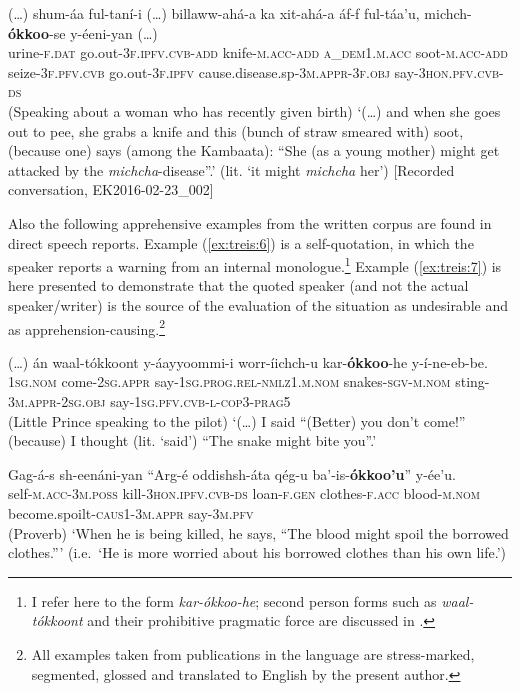 \documentclass[output=paper,colorlinks,citecolor=brown,]{langscibook}
\begin{document}
\ea\label{ex:treis:5}
\gll \textnormal{(\ldots)} 	shum-áa 		ful-taní-i \textnormal{(\ldots)}  billaww-ahá-a 		ka 					xit-ahá-a 			áf-f ful-táa'u, 			michch-\textbf{ókkoo}-se 						y-éeni-yan \textnormal{(\ldots)}\\
{} urine-\textsc{f.dat} go.out-\textsc{3f.ipfv.cvb-add} {} knife-\textsc{m.acc-add} \textsc{a\_dem1.m.acc}	soot-\textsc{m.acc-add}	seize-\textsc{3f.pfv.cvb} go.out-\textsc{3f.ipfv} cause.disease.sp-\textsc{3m.appr-3f.obj} say-\textsc{3hon.pfv.cvb-ds} \\
\glt (Speaking about a woman who has recently given birth) `(\ldots) and when she goes out to pee, she grabs a knife and this (bunch of straw smeared with) soot, (because one) says (among the Kambaata): ``She (as a young mother) might get attacked by the \textit{michcha}-disease''.'  (lit. `it might \textit{michcha} her') [Recorded conversation, EK2016-02-23\_002]
\z

Also the following apprehensive examples from the written corpus are found in direct speech reports. Example (\ref{ex:treis:6}) is a self-quotation, in which the speaker reports a warning from an internal monologue.\footnote{I refer here to the form \textit{kar-ókkoo-he}; second person forms such as \textit{waal-tókkoont} and their prohibitive pragmatic force are discussed in .} Example (\ref{ex:treis:7}) is here presented to demonstrate that the quoted speaker (and not the actual speaker\slash writer) is the source of the evaluation of the situation as undesirable and as apprehension-causing.\footnote{All examples taken from publications in the  language are stress-marked, segmented, glossed and translated to English by the present author.}

\ea\label{ex:treis:6} 
\gll \textnormal{(\ldots)} án waal-tókkoont y-áayyoommi-i worr-íichch-u kar-\textbf{ókkoo}-he y-í-ne-eb-be.\\
{} \textsc{1sg.nom}	come-\textsc{2sg.appr}	say-\textsc{1sg.prog.rel-nmlz1.m.nom} snakes-\textsc{sgv-m.nom} sting-\textsc{3m.appr-2sg.obj} say-\textsc{1sg.pfv.cvb-l-cop3-prag5}\\
\glt (Little Prince speaking to the pilot) `(\ldots) I said ``(Better) you don't come!'' (because) I thought (lit. `said') ``The snake might bite you''.' \citep[87]{Saint-Exupéry2018}
\z 

\ea\label{ex:treis:7} 
\gll Gag-á-s						sh-eenáni-yan		``Arg-é			oddishsh-áta qég-u				ba'-is-\textbf{ókkoo'u}'' 						y-ée'u. \\
self-\textsc{m.acc-3m.poss} kill-\textsc{3hon.ipfv.cvb-ds} \hphantom{[}loan-\textsc{f.gen} clothes-\textsc{f.acc}
blood-\textsc{m.nom} become.spoilt-\textsc{caus1-3m.appr} say-\textsc{3m.pfv}\\
\glt (Proverb) `When he is being killed, he says, ``The blood might spoil the borrowed clothes.''' (i.e.\ `He is more worried about his borrowed clothes than his own life.') \citep[52]{AlamuAlamaayyo2017}
\z
\end{document}
